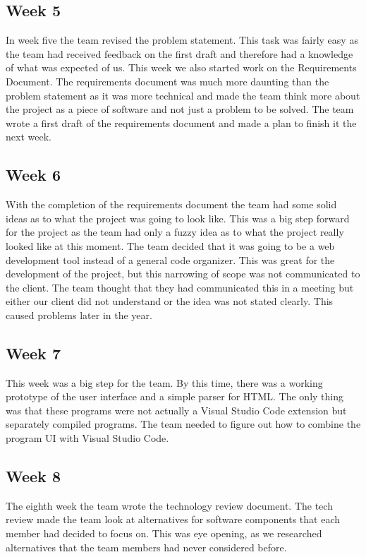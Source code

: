 \documentclass[letterpaper,10pt,titlepage,draftclsnofoot,onecolumn,onesided] {IEEEtran}
\begin{document}
	\subsection{Week 5}
	In week five the team revised the problem statement.
	This task was fairly easy as the team had received feedback on the first draft and therefore had a knowledge of what was expected of us.
	This week we also started work on the Requirements Document. 
	The requirements document was much more daunting than the problem statement as it was more technical and made the team think more about the project as a piece of software and not just a problem to be solved.
	The team wrote a first draft of the requirements document and made a plan to finish it the next week.
	
	\subsection{Week 6}
	With the completion of the requirements document the team had some solid ideas as to what the project was going to look like.
	This was a big step forward for the project as the team had only a fuzzy idea as to what the project really looked like at this moment.
	The team decided that it was going to be a web development tool instead of a general code organizer.
	This was great for the development of the project, but this narrowing of scope was not communicated to the client. 
	The team thought that they had communicated this in a meeting but either our client did not understand or the idea was not stated clearly.
	This caused problems later in the year.
	
	\subsection{Week 7}
	This week was a big step for the team. 
 	By this time, there was a working prototype of the user interface and a simple parser for HTML.
	The only thing was that these programs were not actually a Visual Studio Code extension but separately compiled programs.
	The team needed to figure out how to combine the program UI with Visual Studio Code.
	
	\subsection{Week 8}
	The eighth week the team wrote the technology review document.
	The tech review made the team look at alternatives for software components that each member had decided to focus on.
	This was eye opening, as we researched alternatives that the team members had never considered before.
	
\end{document}
